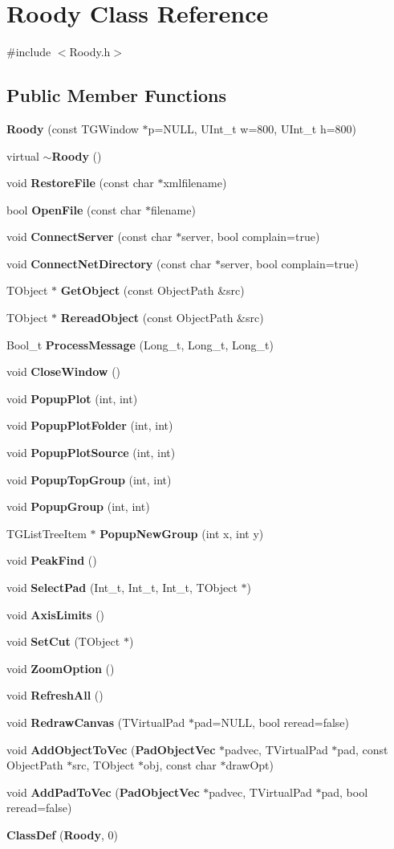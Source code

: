 \section{Roody Class Reference}
\label{classRoody}


{\ttfamily \#include $<$Roody.h$>$}\subsection*{Public Member Functions}
\begin{DoxyCompactItemize}
\item 
{\bf Roody} (const TGWindow $\ast$p=NULL, UInt\_\-t w=800, UInt\_\-t h=800)
\item 
virtual {\bf $\sim$Roody} ()
\item 
void {\bf RestoreFile} (const char $\ast$xmlfilename)
\item 
bool {\bf OpenFile} (const char $\ast$filename)
\item 
void {\bf ConnectServer} (const char $\ast$server, bool complain=true)
\item 
void {\bf ConnectNetDirectory} (const char $\ast$server, bool complain=true)
\item 
TObject $\ast$ {\bf GetObject} (const ObjectPath \&src)
\item 
TObject $\ast$ {\bf RereadObject} (const ObjectPath \&src)
\item 
Bool\_\-t {\bf ProcessMessage} (Long\_\-t, Long\_\-t, Long\_\-t)
\item 
void {\bf CloseWindow} ()
\item 
void {\bf PopupPlot} (int, int)
\item 
void {\bf PopupPlotFolder} (int, int)
\item 
void {\bf PopupPlotSource} (int, int)
\item 
void {\bf PopupTopGroup} (int, int)
\item 
void {\bf PopupGroup} (int, int)
\item 
TGListTreeItem $\ast$ {\bf PopupNewGroup} (int x, int y)
\item 
void {\bf PeakFind} ()
\item 
void {\bf SelectPad} (Int\_\-t, Int\_\-t, Int\_\-t, TObject $\ast$)
\item 
void {\bf AxisLimits} ()
\item 
void {\bf SetCut} (TObject $\ast$)
\item 
void {\bf ZoomOption} ()
\item 
void {\bf RefreshAll} ()
\item 
void {\bf RedrawCanvas} (TVirtualPad $\ast$pad=NULL, bool reread=false)
\item 
void {\bf AddObjectToVec} ({\bf PadObjectVec} $\ast$padvec, TVirtualPad $\ast$pad, const ObjectPath $\ast$src, TObject $\ast$obj, const char $\ast$drawOpt)
\item 
void {\bf AddPadToVec} ({\bf PadObjectVec} $\ast$padvec, TVirtualPad $\ast$pad, bool reread=false)
\item 
{\bf ClassDef} ({\bf Roody}, 0)
\end{DoxyCompactItemize}
